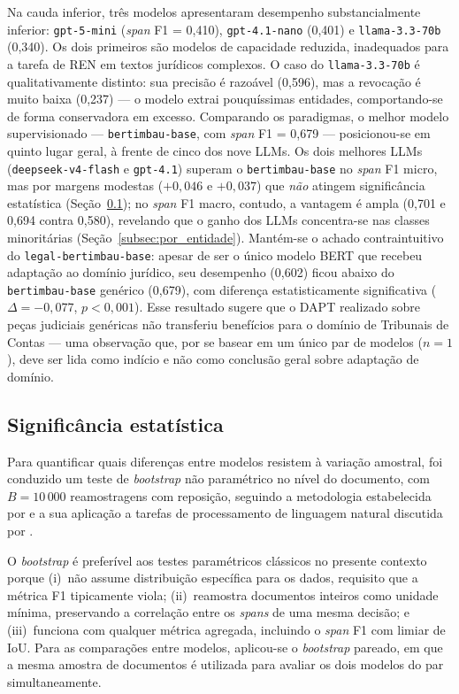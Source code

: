 Na cauda inferior, três modelos apresentaram desempenho substancialmente inferior: \texttt{gpt-5-mini} (\textit{span} F1 = 0,410), \texttt{gpt-4.1-nano} (0,401) e \texttt{llama-3.3-70b} (0,340). Os dois primeiros são modelos de capacidade reduzida, inadequados para a tarefa de REN em textos jurídicos complexos. O caso do \texttt{llama-3.3-70b} é qualitativamente distinto: sua precisão é razoável (0,596), mas a revocação é muito baixa (0,237) --- o modelo extrai pouquíssimas entidades, comportando-se de forma conservadora em excesso. Comparando os paradigmas, o melhor modelo supervisionado --- \texttt{bertimbau-base}, com \textit{span} F1 = 0,679 --- posicionou-se em quinto lugar geral, à frente de cinco dos nove LLMs. Os dois melhores LLMs (\texttt{deepseek-v4-flash} e \texttt{gpt-4.1}) superam o \texttt{bertimbau-base} no \textit{span} F1 micro, mas por margens modestas ($+0{,}046$ e $+0{,}037$) que \emph{não} atingem significância estatística (Seção~\ref{subsec:significancia}); no \textit{span} F1 macro, contudo, a vantagem é ampla (0,701 e 0,694 contra 0,580), revelando que o ganho dos LLMs concentra-se nas classes minoritárias (Seção~\ref{subsec:por_entidade}). Mantém-se o achado contraintuitivo do \texttt{legal-bertimbau-base}: apesar de ser o único modelo BERT que recebeu adaptação ao domínio jurídico, seu desempenho (0,602) ficou abaixo do \texttt{bertimbau-base} genérico (0,679), com diferença estatisticamente significativa ($\Delta = -0{,}077$, $p < 0{,}001$). Esse resultado sugere que o DAPT realizado sobre peças judiciais genéricas não transferiu benefícios para o domínio de Tribunais de Contas --- uma observação que, por se basear em um único par de modelos ($n = 1$), deve ser lida como indício e não como conclusão geral sobre adaptação de domínio.

\subsection{Significância estatística}
\label{subsec:significancia}

Para quantificar quais diferenças entre modelos resistem à variação amostral, foi conduzido um teste de \textit{bootstrap} não paramétrico no nível do documento, com $B = 10\,000$ reamostragens com reposição, seguindo a metodologia estabelecida por  e a sua aplicação a tarefas de processamento de linguagem natural discutida por . 

O \textit{bootstrap} é preferível aos testes paramétricos clássicos no presente contexto porque (i)~não assume distribuição específica para os dados, requisito que a métrica F1 tipicamente viola; (ii)~reamostra documentos inteiros como unidade mínima, preservando a correlação entre os \textit{spans} de uma mesma decisão; e (iii)~funciona com qualquer métrica agregada, incluindo o \textit{span} F1 com limiar de IoU. Para as comparações entre modelos, aplicou-se o \textit{bootstrap} pareado, em que a mesma amostra de documentos é utilizada para avaliar os dois modelos do par simultaneamente.

